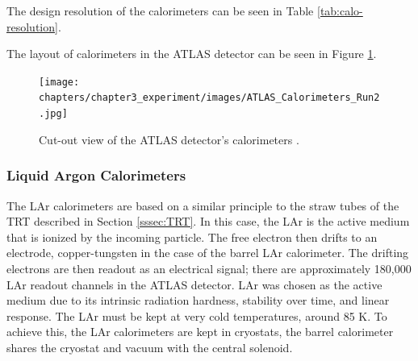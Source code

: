 		The design resolution of the calorimeters can be seen in Table \ref{tab:calo-resolution}.

		\begin{table}[!thp]
		\centering
		\caption{ Design resolution of EM and hadronic calorimeters in the \gls{ATLAS} Detector \cites{LAr-TDR}{ATLAS-tile}.}
		\label{tab:calo-resolution}
		\end{table}

		The layout of calorimeters in the \gls{ATLAS} detector can be seen in Figure \ref{fig:calo-layout}.
		\begin{figure}[!ht]
		\centering
		\texttt{[image: chapters/chapter3\_experiment/images/ATLAS\_Calorimeters\_Run2.jpg]}
		\caption{ Cut-out view of the \gls{ATLAS} detector's calorimeters \cite{atlas-schematics}.}
		\label{fig:calo-layout}
		\end{figure}

		\subsubsection{Liquid Argon Calorimeters}\label{sssec:LAr}
			The \gls{LAr} calorimeters are based on a similar principle to the straw tubes of the \gls{TRT} described in Section \ref{sssec:TRT}. In this case, the \gls{LAr} is the active medium that is ionized by the incoming particle. The free electron then drifts to an electrode, copper-tungsten in the case of the barrel \gls{LAr} calorimeter. The drifting electrons are then readout as an electrical signal; there are approximately 180,000 \gls{LAr} readout channels in the \gls{ATLAS} detector. \gls{LAr} was chosen as the active medium due to its intrinsic radiation hardness, stability over time, and linear response. The \gls{LAr} must be kept at very cold temperatures, around 85 K. To achieve this, the \gls{LAr} calorimeters are kept in cryostats, the barrel calorimeter shares the cryostat and vacuum with the central solenoid.

